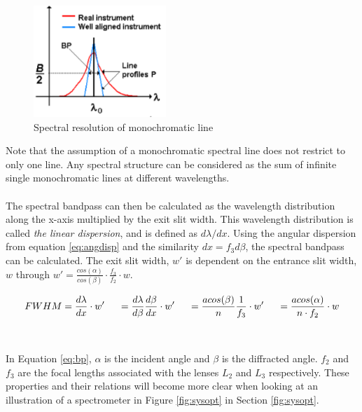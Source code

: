 \begin{figure}[H]
    \centering
    \includegraphics[width=5cm]{Images/theory/bp.png}
    \caption{Spectral resolution of monochromatic line}
    \label{fig:bp}
\end{figure}
\noindent
Note that the assumption of a monochromatic spectral line does not restrict to only one line. Any spectral structure can be considered as the sum of infinite single monochromatic lines at different wavelengths.
\\\\
The spectral bandpass can then be calculated as the wavelength distribution along the x-axis multiplied by the exit slit width. This wavelength distribution is called \textit{the linear dispersion}, and is defined as $d\lambda/dx$. Using the angular dispersion from equation \ref{eq:angdisp} and the similarity $dx = f_3 d\beta$, the spectral bandpass can be calculated. The exit slit width, $w'$ is dependent on the entrance slit width, $w$ through $w' = \frac{cos(\alpha)}{cos(\beta)}\cdot \frac{f_3}{f_2}\cdot w$.

\begin{equation}
    FWHM = \frac{d\lambda}{dx} \cdot w'\hspace{0.5cm}
    = \frac{d\lambda}{d\beta} \frac{d\beta}{dx}\cdot w' \hspace{0.5cm}
    = \frac{a cos(\beta)}{n} \frac{1}{f_3}\cdot w' \hspace{0.5cm}
    = \frac{a cos(\alpha)}{n\cdot f_2}\cdot w
    \label{eq:bp}
\end{equation}
\\\\
\noindent
In Equation \ref{eq:bp}, $\alpha$ is the incident angle and $\beta$ is the diffracted angle. $f_2$ and $f_3$ are the focal lengths associated with the lenses $L_2$ and $L_3$ respectively. These properties and their relations will become more clear when looking at an illustration of a spectrometer in Figure \ref{fig:sysopt} in Section \ref{fig:sysopt}.


